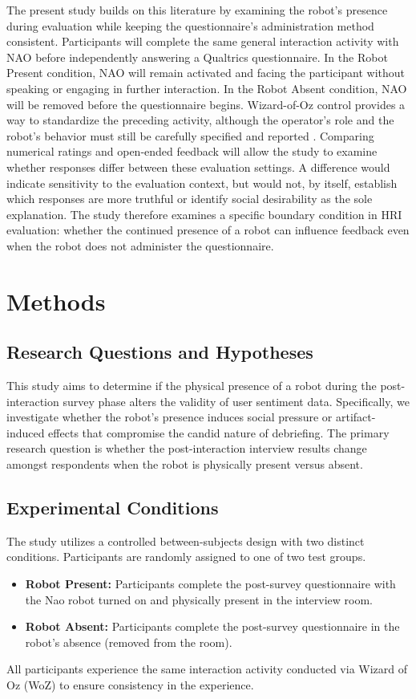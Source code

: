 \documentclass[sigconf,nonacm]{acmart}
\newif\ifdraftspacing
\newcommand{\draftspace}[1]{\ifdraftspacing\par\vspace*{#1}\fi}
\begin{document}
The present study builds on this literature by examining the robot's presence during evaluation while keeping the questionnaire's administration method consistent. Participants will complete the same general interaction activity with NAO before independently answering a Qualtrics questionnaire. In the Robot Present condition, NAO will remain activated and facing the participant without speaking or engaging in further interaction. In the Robot Absent condition, NAO will be removed before the questionnaire begins. Wizard-of-Oz control provides a way to standardize the preceding activity, although the operator's role and the robot's behavior must still be carefully specified and reported \cite{riek2012}. Comparing numerical ratings and open-ended feedback will allow the study to examine whether responses differ between these evaluation settings. A difference would indicate sensitivity to the evaluation context, but would not, by itself, establish which responses are more truthful or identify social desirability as the sole explanation. The study therefore examines a specific boundary condition in HRI evaluation: whether the continued presence of a robot can influence feedback even when the robot does not administer the questionnaire.
\draftspace{12mm}

\section{Methods}
\label{sec:methods}

\subsection{Research Questions and Hypotheses}
This study aims to determine if the physical presence of a robot during the post-interaction survey phase alters the validity of user sentiment data. Specifically, we investigate whether the robot's presence induces social pressure or artifact-induced effects that compromise the candid nature of debriefing. The primary research question is whether the post-interaction interview results change amongst respondents when the robot is physically present versus absent.

\subsection{Experimental Conditions}
The study utilizes a controlled between-subjects design with two distinct conditions. Participants are randomly assigned to one of two test groups.
\begin{itemize}
    \item \textbf{Robot Present:} Participants complete the post-survey questionnaire with the Nao robot turned on and physically present in the interview room.
    \item \textbf{Robot Absent:} Participants complete the post-survey questionnaire in the robot's absence (removed from the room).
\end{itemize}
All participants experience the same interaction activity conducted via Wizard of Oz (WoZ) to ensure consistency in the experience.
\end{document}
